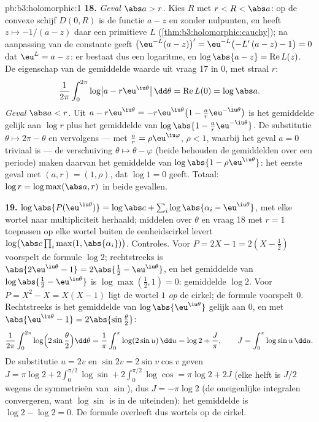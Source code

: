 \begin{solution}{pb:b3:holomorphic:1}
\textbf{18.} \emph{Geval $\abs a > r$.} Kies $R$ met $r < R <
\abs a$: op de convexe schijf $D(0, R)$ is de functie $a - z$
 en zonder nulpunten, en heeft $z \mapsto -1/(a - z)$
daar een primitieve $L$ (\cref{thm:b3:holomorphic:cauchy}); na
aanpassing van de constante geeft $\bigl(\eu^{-L}(a -
z)\bigr)' = \eu^{-L}\bigl(-L'\,(a - z) - 1\bigr) = 0$ dat
$\eu^L = a - z$: er bestaat dus een  logaritme, en
$\log\abs{a - z} = \operatorname{Re}L(z)$. De eigenschap van de
gemiddelde waarde uit vraag 17 in $0$, met straal $r$:
\[
\frac1{2\pi}\int_0^{2\pi}
\log\bigl|a - r\eu^{\iu\theta}\bigr|\,\dd\theta
= \operatorname{Re}L(0) = \log\abs a .
\]
\emph{Geval $\abs a < r$.} Uit $a - r\eu^{\iu\theta} =
-r\eu^{\iu\theta}\bigl(1 - \frac ar\eu^{-\iu\theta}\bigr)$ is het
gemiddelde gelijk aan $\log r$ plus het gemiddelde van
$\log\abs{1 - \frac ar\eu^{-\iu\theta}}$. De substitutie $\theta
\mapsto 2\pi - \theta$ en vervolgens --- met $\frac ar =
\rho\eu^{\iu\varphi}$, $\rho < 1$, waarbij het geval $a = 0$
triviaal is --- de verschuiving $\theta \mapsto \theta - \varphi$
(beide behouden de gemiddelden over een periode) maken daarvan
het gemiddelde van $\log\abs{1 - \rho\eu^{\iu\theta}}$: het
eerste geval met $(a, r) = (1, \rho)$, dat $\log 1 = 0$ geeft.
Totaal: $\log r = \log\max(\abs a, r)$ in beide gevallen.

\textbf{19.} $\log\abs{P(\eu^{\iu\theta})} = \log\abs c +
\sum_i\log\abs{\alpha_i - \eu^{\iu\theta}}$, met elke wortel naar
multipliciteit herhaald; middelen over $\theta$ en vraag 18 met
$r = 1$ toepassen op elke wortel buiten de eenheidscirkel levert
$\log\bigl(\abs c\prod_i\max(1, \abs{\alpha_i})\bigr)$.
Controles. Voor $P = 2X - 1 = 2(X - \frac12)$ voorspelt de
formule $\log 2$; rechtstreeks is $\abs{2\eu^{\iu\theta} - 1} =
2\abs{\frac12 - \eu^{\iu\theta}}$, en het gemiddelde van
$\log\abs{\frac12 - \eu^{\iu\theta}}$ is $\log\max(\frac12, 1) =
0$: gemiddelde $\log 2$. Voor $P = X^2 - X = X(X - 1)$ ligt de
wortel $1$ \emph{op} de cirkel; de formule voorspelt $0$.
Rechtstreeks is het gemiddelde van $\log\abs{\eu^{\iu\theta}}$
gelijk aan $0$, en met $\abs{\eu^{\iu\theta} - 1} =
2\abs{\sin\frac\theta2}$:
\[
\frac1{2\pi}\int_0^{2\pi}
\log\Bigl(2\sin\frac\theta2\Bigr)\dd\theta
= \frac1\pi\int_0^\pi\log(2\sin u)\,\dd u
= \log 2 + \frac J\pi,
\qquad J = \int_0^\pi\log\sin u\,\dd u .
\]
De substitutie $u = 2v$ en $\sin 2v = 2\sin v\cos v$ geven $J =
\pi\log2 + 2\int_0^{\pi/2}\log\sin + 2\int_0^{\pi/2}\log\cos =
\pi\log 2 + 2J$ (elke helft is $J/2$ wegens de symmetrieën van
$\sin$), dus $J = -\pi\log 2$ (de oneigenlijke integralen
convergeren, want $\log\sin$ is  in de uiteinden):
het gemiddelde is $\log2 - \log2 = 0$. De formule overleeft dus
wortels op de cirkel.


\end{solution}
